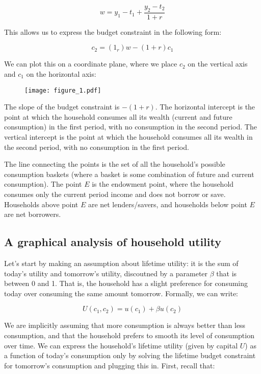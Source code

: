 \documentclass[12pt]{article}
\begin{document}
\[ w = y_1 - t_1 + \frac{y_2 - t_2}{1+r} \]

This allows us to express the budget constraint in the following form:

\[ c_2 = (1_r) w - (1+r) c_1 \]

We can plot this on a coordinate plane, where we place \(c_2\) on the vertical axis and \(c_1\) on the horizontal axis:

\begin{figure}[H]
    \texttt{[image: figure\_1.pdf]}
\end{figure}

The slope of the budget constraint is \(-(1+r)\). The horizontal intercept is the point at which the household consumes all its wealth (current and future consumption) in the first period, with no consumption in the second period. The vertical intercept is the point at which the household consumes all its wealth in the second period, with no consumption in the first period. 

The line connecting the points is the set of all the household's possible consumption baskets (where a basket is some combination of future and current consumption). The point \(E\) is the endowment point, where the household consumes only the current period income and does not borrow or save. Households above point \(E\) are net lenders/savers, and households below point \(E\) are net borrowers.

\subsection{A graphical analysis of household utility}

Let's start by making an assumption about lifetime utility: it is the sum of today's utility and tomorrow's utility, discoutned by a parameter \(\beta\) that is between 0 and 1. That is, the household has a slight preference for consuming today over consuming the same amount tomorrow. Formally, we can write:

\[ U(c_1,c_2) = u(c_1) + \beta u(c_2) \]

We are implicitly assuming that more consumption is always better than less consumption, and that the household prefers to smooth its level of consumption over time. We can express the household's lifetime utility (given by capital \(U\)) as a function of today's consumption only by solving the lifetime budget constraint for tomorrow's consumption and plugging this in. First, recall that:
\end{document}
